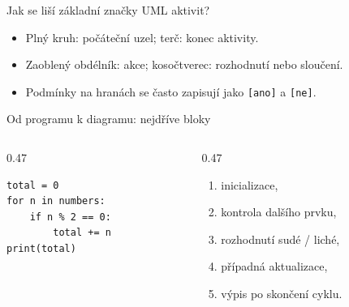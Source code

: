\documentclass[aspectratio=169]{beamer}
\begin{document}
\begin{frame}{Jak se liší základní značky UML aktivit?}
  \centering
  \vspace{7mm}
  \begin{itemize}
    \item Plný kruh: počáteční uzel; terč: konec aktivity.
    \item Zaoblený obdélník: akce; kosočtverec: rozhodnutí nebo sloučení.
    \item Podmínky na hranách se často zapisují jako \texttt{[ano]} a \texttt{[ne]}.
  \end{itemize}
\end{frame}

\begin{frame}[fragile]{Od programu k diagramu: nejdříve bloky}
  \vspace{3mm}
  \begin{columns}[T]
    \begin{column}{0.47\textwidth}
\begin{lstlisting}[style=python,basicstyle=\ttfamily\footnotesize]
total = 0
for n in numbers:
    if n % 2 == 0:
        total += n
print(total)
\end{lstlisting}
    \end{column}
    \begin{column}{0.47\textwidth}
      \begin{enumerate}
        \item inicializace,
        \item kontrola dalšího prvku,
        \item rozhodnutí sudé / liché,
        \item případná aktualizace,
        \item výpis po skončení cyklu.
      \end{enumerate}
    \end{column}
  \end{columns}
\end{frame}
\end{document}
